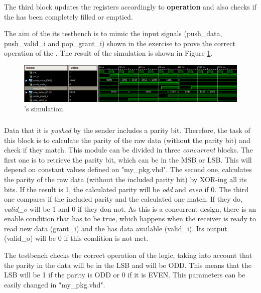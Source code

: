 \documentclass[12pt]{article}
\begin{document}
The third block updates the registers accordingly to \textbf{operation} and also checks if the \fifo has been completely filled or emptied.

The aim of the its testbench is to mimic the input signals (push\_data, push\_valid\_i and pop\_grant\_i) shown in the exercise to prove the correct operation of the \fifo.  The result of the simulation is shown in Figure \ref{fig: FIFO simulation}.

\begin{figure}[ht]
\centering
\includegraphics[width=15cm]{images/fifo-simulation}
\caption{\label{fig: FIFO simulation} \fifo's simulation.}
\end{figure}

\subsubsection{\paritycheck}
\label{subsubsection: Parity Check}

Data that it is \textit{pushed} by the sender includes a parity bit. Therefore, the task of this block is to calculate the parity of the raw data (without the parity bit) and check if they match. This module can be divided in three \textit{concurrent} blocks. The first one is to retrieve the parity bit, which can be in the MSB or LSB. This will depend on constant values defined on "my\_pkg.vhd". The second one, calculates the parity of the raw data (without the included parity bit) by XOR-ing all its bits. If the result is 1, the calculated parity will be \textit{odd} and \textit{even} if 0. The third one compares if the included parity and the calculated one match. If they do, \textit{valid\_o} will be 1 and 0 if they don not. As this is a concurrent design, there is an enable condition that has to be true, which happens when the receiver is ready to read new data (grant\_i) and the \fifo has data available (valid\_i).  Its output (valid\_o) will be 0 if this condition is not met.

The testbench checks the correct operation of the logic, taking into account that the parity in the data will be in the LSB and will be ODD.  This means that the LSB will be 1 if the parity is ODD or 0 if it is EVEN. This parameters can be easily changed in "my\_pkg.vhd".  
\end{document}

